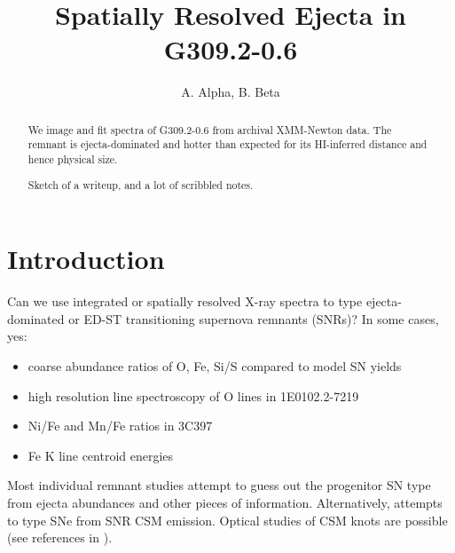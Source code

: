 \documentclass[preprint2,tighten,trackchanges]{aastex6}
\newcommand*{\tsup}{\textsuperscript}
\begin{document}
\title{Spatially Resolved Ejecta in G309.2-0.6}

\author{
A. Alpha, B. Beta%
}




\begin{abstract}
We image and fit spectra of G309.2-0.6 from archival XMM-Newton data.
The remnant is ejecta-dominated and hotter than expected for its HI-inferred
distance and hence physical size.

Sketch of a writeup, and a lot of scribbled notes.
\end{abstract}


\section{Introduction} \label{sec:intro}

Can we use integrated or spatially resolved X-ray spectra to type
ejecta-dominated or ED-ST transitioning supernova remnants (SNRs)?
In some cases, yes:
\begin{itemize}
    \item coarse abundance ratios of O, Fe, Si/S compared to model SN yields \citep{hughes1995}  %
    \item high resolution line spectroscopy of O lines in 1E0102.2-7219 \citep{flanagan2004}  %
    \item Ni/Fe and Mn/Fe ratios in 3C397 \citep{yamaguchi2015}
    \item Fe K line centroid energies \citep{yamaguchi2014-iron, patnaude2015}
\end{itemize}
Most individual remnant studies attempt to guess out the progenitor SN type
from ejecta abundances and other pieces of information.
Alternatively, \citet{chevalier2005} attempts to type SNe from SNR CSM
emission.
Optical studies of CSM knots are possible (see references in
\citet{katsuda2015}).
\end{document}

